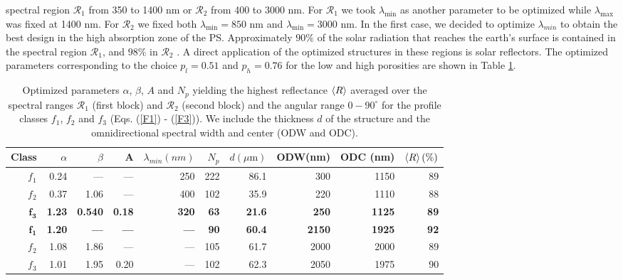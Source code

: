 \documentclass[a4paper,fleqn]{cas-sc}
\begin{document}
	spectral region $\mathcal R_1$ from 350 to
	1400 nm or $\mathcal R_2$ from 400 to 3000 nm. For $\mathcal R_1$ we took
	$\lambda_{\min}$ as another parameter to be optimized while $\lambda_{\max}$
	was fixed at 1400 nm. For $\mathcal R_2$ we fixed both
	$\lambda_{\min}=850$ nm and $\lambda_{\min}=3000$ nm.
	In the first case, we decided to optimize $\lambda_{min}$ to 
	obtain the best design in the high absorption zone of the PS.
	Approximately $90\%$ of the solar radiation that reaches the
	earth's surface is contained in the spectral region
	$\mathcal R_1$, and $98\%$ in $\mathcal R_2$ \cite{Bird1983}. 
	A direct
	application of the optimized structures in these regions is solar
	reflectors. The
	optimized parameters corresponding to the choice $p_l=0.51$ and
	$p_h=0.76$ for the low and high porosities
	are shown in Table \ref{tab:tableA}.
	
	\begin{table}
		\centering
		\label{tab:tableA}
		\addtolength{\tabcolsep}{-2pt}
		\begin{tabular}{rrrrrrrrrr}
			Class&$\alpha$&$\beta$&A&$\lambda_{min}(nm)$&$N_{p}$&$d(\mu\text{m})$       &ODW(nm)&ODC (nm)&$\braket{R}(\%)$\\
			\hline
			\hline
			$f_{1}$     &0.24    &---      &---     &250&222   &86.1    &300    &1150    &89\\
			$f_{2}$     &0.37    &1.06     &---     &400&102   &35.9    &220    &1110    &88\\
			$\bm{f_{3}}$&\bf 1.23&\bf 0.540&\bf 0.18&\bf 320&\bf 63&\bf 21.6&\bf 250&\bf 1125&\bf 89\\
			\hline
			$\bm{f_{1}}$&\bf 1.20&\bf ---  &\bf --- &\bf ---&\bf 90&\bf 60.4&\bf 2150&\bf 1925&\bf 92\\
			$f_{2}$     &1.08    &1.86     &---  &---  &105   &61.7    &2000    &2000    &89\\
			$f_{3}$     &1.01    &1.95     &0.20  &---  &102   &62.3    &2050    &1975    &90\\
		\end{tabular}
		\caption{Optimized parameters $\alpha$, $\beta$, $A$ and $N_p$ yielding the highest
			reflectance $\braket{R}$ averaged over the spectral ranges
			$\mathcal R_1$ (first block) and $\mathcal R_2$ (second block) and
			the angular range $0-90^\circ$ for the profile classes $f_1$, $f_2$ and
			$f_3$ (Eqs. (\ref{F1}) - (\ref{F3})). We include the thickness $d$
			of the structure and the omnidirectional spectral
			width and center (ODW and ODC).}
	\end{table}
	
\end{document}
